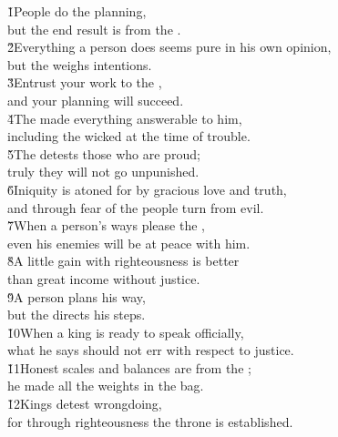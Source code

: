 \begin{poetry}
\poeml {}
\v{1}People do the planning, \\
\poeml but the end result is from the . \\
\poeml \v{2}Everything a person does seems pure in his own opinion, \\
\poemll    but the  weighs intentions. \\
\poeml \v{3}Entrust your work to the , \\
\poemll    and your planning will succeed. \\
\poeml \v{4}The  made everything answerable to him, \\
\poemll    including the wicked at the time of trouble. \\
\poeml \v{5}The  detests those who are proud; \\
\poemll    truly they will not go unpunished. \\
\poeml \v{6}Iniquity is atoned for by gracious love and truth, \\
\poemll    and through fear of the  people turn from evil. \\
\poeml \v{7}When a person's ways please the , \\
\poemll    even his enemies will be at peace with him. \\
\poeml \v{8}A little gain with righteousness is better \\
\poemll    than great income without justice. \\
\poeml \v{9}A person plans his way, \\
\poemll    but the  directs his steps. \\
\poeml \v{10}When a king is ready to speak officially, \\
\poemll    what he says should not err with respect to justice. \\
\poeml \v{11}Honest scales and balances are from the ; \\
\poemll    he made all the weights in the bag. \\
\poeml \v{12}Kings detest wrongdoing, \\
\poemll    for through righteousness the throne is established. \\

\end{poetry}
